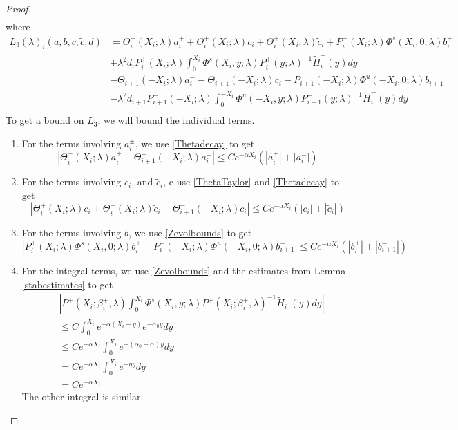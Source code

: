 \documentclass[thesis.tex]{subfiles}
\begin{document}
\begin{lemma}
\begin{proof}
\begin{align}
\end{align}
where
\begin{align*}
L_3(\lambda)_i(a, b, c, \tilde{c}, d) &= \Theta_i^+(X_i; \lambda)a_i^+ + \Theta_i^+(X_i; \lambda)c_i + \Theta_i^+(X_i; \lambda)\tilde{c}_i + P_i^+(X_i; \lambda)\Phi^s(X_i, 0; \lambda) b_i^+ \\
&+ \lambda^2 d_i P_i^+(X_i; \lambda) \int_0^{X_i} \Phi^s(X_i, y; \lambda) P_i^+(y; \lambda)^{-1} \tilde{H}_i^+(y) dy \\
&- \Theta_{i+1}^-(-X_i; \lambda)a_i^- - \Theta_{i+1}^-(-X_i; \lambda)c_i - P_{i+1}^-(-X_i; \lambda)\Phi^u(-X_i, 0; \lambda) b_{i+1}^- \\ &- \lambda^2 d_{i+1} P_{i+1}^-(-X_i; \lambda) \int_0^{-X_i} \Phi^u(-X_i, y; \lambda) P_{i+1}^-(y; \lambda)^{-1} \tilde{H}_i^-(y) dy \\
\end{align*}
To get a bound on $L_3$, we will bound the individual terms. 
\begin{enumerate}
\item For the terms involving $a_i^\pm$, we use \eqref{Thetadecay} to get
\[
|\Theta_i^+(X_i; \lambda)a_i^+ - \Theta_{i+1}^-(-X_i; \lambda)a_i^-| \leq C e^{-\alpha X_i}(|a_i^+| + |a_i^-|)
\]
\item For the terms involving $c_i$, and $\tilde{c}_i$, e use \eqref{ThetaTaylor} and \eqref{Thetadecay} to get
\[
|\Theta_i^+(X_i; \lambda)c_i + \Theta_i^+(X_i; \lambda)\tilde{c}_i - \Theta_{i+1}^-(-X_i; \lambda)c_i| \leq 
C e^{-\alpha X_i} (|c_i| + |\tilde{c}_i|)
\]

\item For the terms involving $b$, we use \eqref{Zevolbounds} to get
\[
| P_i^+(X_i; \lambda)\Phi^s(X_i, 0; \lambda) b_i^+ - P_i^-(-X_i; \lambda) \Phi^u(-X_i, 0; \lambda) b_{i+1}^-| \leq C e^{-\alpha X_i} (|b_i^+| + |b_{i+1}^-|)
\]

\item For the integral terms, we use \eqref{Zevolbounds} and the estimates from Lemma \ref{stabestimates} to get
\begin{align*}
&\left|
P^+(X_i; \beta_i^+, \lambda) \int_0^{X_i} \Phi^s(X_i, y; \lambda) P^+(X_i; \beta_i^+, \lambda)^{-1} \tilde{H}_i^+(y) dy \right| \\
&\leq C \int_0^{X_i} e^{-\alpha(X_i - y)}e^{-\alpha_0 y} dy \\
&\leq C e^{-\alpha X_i} \int_0^{X_i} e^{-(\alpha_0 - \alpha)y} dy \\
&= C e^{-\alpha X_i} \int_0^{X_i} e^{-\eta y} dy \\ 
&= C e^{-\alpha X_i}
\end{align*}
The other integral is similar.


\end{enumerate}
\end{proof}
\end{lemma}
\end{document}
